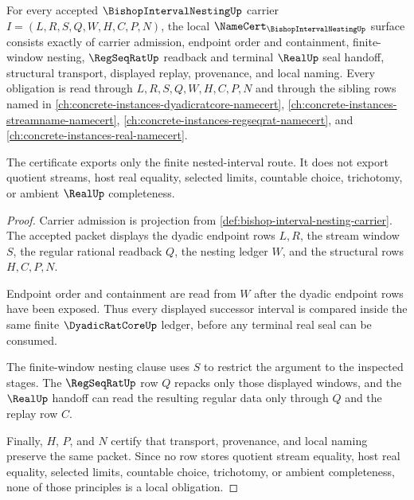 \begin{theorem}
\label{thm:bishop-interval-nesting-namecert-obligations}
For every accepted $\BishopIntervalNestingUp$ carrier $I=(L,R,S,Q,W,H,C,P,N)$, the local $\NameCert_{\BishopIntervalNestingUp}$ surface consists exactly of carrier admission, endpoint order and containment, finite-window nesting, $\RegSeqRatUp$ readback and terminal $\RealUp$ seal handoff, structural transport, displayed replay, provenance, and local naming. Every obligation is read through $L,R,S,Q,W,H,C,P,N$ and through the sibling rows named in \autoref{ch:concrete-instances-dyadicratcore-namecert}, \autoref{ch:concrete-instances-streamname-namecert}, \autoref{ch:concrete-instances-regseqrat-namecert}, and \autoref{ch:concrete-instances-real-namecert}.

The certificate exports only the finite nested-interval route. It does not export quotient streams, host real equality, selected limits, countable choice, trichotomy, or ambient $\RealUp$ completeness.
\end{theorem}
\begin{proof}
Carrier admission is projection from \autoref{def:bishop-interval-nesting-carrier}. The accepted packet displays the dyadic endpoint rows $L,R$, the stream window $S$, the regular rational readback $Q$, the nesting ledger $W$, and the structural rows $H,C,P,N$.

Endpoint order and containment are read from $W$ after the dyadic endpoint rows have been exposed. Thus every displayed successor interval is compared inside the same finite $\DyadicRatCoreUp$ ledger, before any terminal real seal can be consumed.

The finite-window nesting clause uses $S$ to restrict the argument to the inspected stages. The $\RegSeqRatUp$ row $Q$ repacks only those displayed windows, and the $\RealUp$ handoff can read the resulting regular data only through $Q$ and the replay row $C$.

Finally, $H$, $P$, and $N$ certify that transport, provenance, and local naming preserve the same packet. Since no row stores quotient stream equality, host real equality, selected limits, countable choice, trichotomy, or ambient completeness, none of those principles is a local obligation.
\end{proof}


